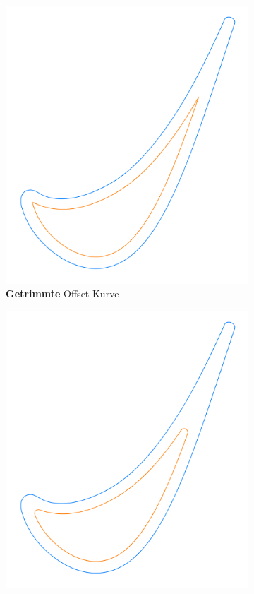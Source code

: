 \documentclass[8pt, aspectratio=169]{beamer}
\begin{document}
\begin{frame}
\begin{minipage}[t]{\textwidth}
\begin{figure}[H]
\begin{subfigure}{.32\textwidth}
				\includegraphics[width=\textwidth]{../../tec/shrinking/62.png}
				\caption{\textbf{Getrimmte} Offset-Kurve}
			\end{subfigure}
			\begin{subfigure}{.32\textwidth}
				\includegraphics[width=\textwidth]{../../tec/shrinking/63.png}

\end{subfigure}
\end{figure}
\end{minipage}
\end{frame}
\end{document}

